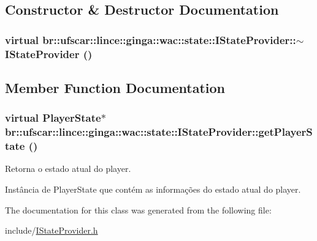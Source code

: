 \subsection{Constructor \& Destructor Documentation}
\hypertarget{classbr_1_1ufscar_1_1lince_1_1ginga_1_1wac_1_1state_1_1IStateProvider_a5a3e4a2209741be59347f6a0d7ba6732}{
\subsubsection[{$\sim$IStateProvider}]{\setlength{\rightskip}{0pt plus 5cm}virtual br::ufscar::lince::ginga::wac::state::IStateProvider::$\sim$IStateProvider ()}}
\label{classbr_1_1ufscar_1_1lince_1_1ginga_1_1wac_1_1state_1_1IStateProvider_a5a3e4a2209741be59347f6a0d7ba6732}


\subsection{Member Function Documentation}
\hypertarget{classbr_1_1ufscar_1_1lince_1_1ginga_1_1wac_1_1state_1_1IStateProvider_a9616b84638f876ff749ffd8c76162f78}{
\subsubsection[{getPlayerState}]{\setlength{\rightskip}{0pt plus 5cm}virtual PlayerState$\ast$ br::ufscar::lince::ginga::wac::state::IStateProvider::getPlayerState ()}}
\label{classbr_1_1ufscar_1_1lince_1_1ginga_1_1wac_1_1state_1_1IStateProvider_a9616b84638f876ff749ffd8c76162f78}


Retorna o estado atual do player. 

Instância de PlayerState que contém as informações do estado atual do player. 

The documentation for this class was generated from the following file:\begin{DoxyCompactItemize}
\item 
include/\hyperlink{IStateProvider_8h}{IStateProvider.h}\end{DoxyCompactItemize}
